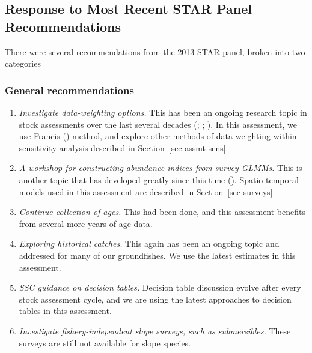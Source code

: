 \documentclass[
]{scrartcl}
\providecommand{\tightlist}{%
  \setlength{\itemsep}{0pt}\setlength{\parskip}{0pt}}\usepackage{longtable,booktabs,array}
\begin{document}
\subsection{Response to Most Recent STAR Panel
Recommendations}\label{response-to-most-recent-star-panel-recommendations}

There were several recommendations from the 2013 STAR panel, broken into
two categories

\subsubsection{General recommendations}\label{general-recommendations}

\begin{enumerate}
\def\labelenumi{\arabic{enumi}.}
\tightlist
\item
  \emph{Investigate data-weighting options.} This has been an ongoing
  research topic in stock assessments over the last several decades
  (;
  ;
  ). In
  this assessment, we use Francis
  () method, and explore other
  methods of data weighting within sensitivity analysis described in
  Section~\ref{sec-assmt-sens}.
\item
  \emph{A workshop for constructing abundance indices from survey
  GLMMs.} This is another topic that has developed greatly since this
  time (). Spatio-temporal models used in this assessment are described
  in Section~\ref{sec-surveys}.
\item
  \emph{Continue collection of ages.} This had been done, and this
  assessment benefits from several more years of age data.
\item
  \emph{Exploring historical catches.} This again has been an ongoing
  topic and addressed for many of our groundfishes. We use the latest
  estimates in this assessment.
\item
  \emph{SSC guidance on decision tables.} Decision table discussion
  evolve after every stock assessment cycle, and we are using the latest
  approaches to decision tables in this assessment.
\item
  \emph{Investigate fishery-independent slope surveys, such as
  submersibles.} These surveys are still not available for slope
  species.
\end{enumerate}
\end{document}
